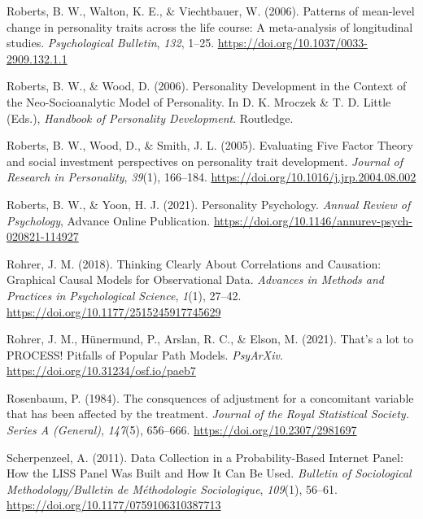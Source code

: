\documentclass[
  english,
  man, noextraspace]{apa7}
\begin{document}
\leavevmode\hypertarget{ref-robertsPatternsMeanlevelChange2006a}{}%
Roberts, B. W., Walton, K. E., \& Viechtbauer, W. (2006). Patterns of mean-level change in personality traits across the life course: A meta-analysis of longitudinal studies. \emph{Psychological Bulletin}, \emph{132}, 1--25. \url{https://doi.org/10.1037/0033-2909.132.1.1}

\leavevmode\hypertarget{ref-robertsPersonalityDevelopmentContext2006}{}%
Roberts, B. W., \& Wood, D. (2006). Personality Development in the Context of the Neo-Socioanalytic Model of Personality. In D. K. Mroczek \& T. D. Little (Eds.), \emph{Handbook of Personality Development}. Routledge.

\leavevmode\hypertarget{ref-robertsEvaluatingFiveFactor2005}{}%
Roberts, B. W., Wood, D., \& Smith, J. L. (2005). Evaluating Five Factor Theory and social investment perspectives on personality trait development. \emph{Journal of Research in Personality}, \emph{39}(1), 166--184. \url{https://doi.org/10.1016/j.jrp.2004.08.002}

\leavevmode\hypertarget{ref-robertsPersonalityPsychology2021}{}%
Roberts, B. W., \& Yoon, H. J. (2021). Personality Psychology. \emph{Annual Review of Psychology}, Advance Online Publication. \url{https://doi.org/10.1146/annurev-psych-020821-114927}

\leavevmode\hypertarget{ref-rohrerThinkingClearlyCorrelations2018}{}%
Rohrer, J. M. (2018). Thinking Clearly About Correlations and Causation: Graphical Causal Models for Observational Data. \emph{Advances in Methods and Practices in Psychological Science}, \emph{1}(1), 27--42. \url{https://doi.org/10.1177/2515245917745629}

\leavevmode\hypertarget{ref-rohrerThatLotPROCESS2021}{}%
Rohrer, J. M., Hünermund, P., Arslan, R. C., \& Elson, M. (2021). That's a lot to PROCESS! Pitfalls of Popular Path Models. \emph{PsyArXiv}. \url{https://doi.org/10.31234/osf.io/paeb7}

\leavevmode\hypertarget{ref-rosenbaumConsquencesAdjustmentConcomitant1984}{}%
Rosenbaum, P. (1984). The consquences of adjustment for a concomitant variable that has been affected by the treatment. \emph{Journal of the Royal Statistical Society. Series A (General)}, \emph{147}(5), 656--666. \url{https://doi.org/10.2307/2981697}

\leavevmode\hypertarget{ref-scherpenzeelDataCollectionProbabilityBased2011}{}%
Scherpenzeel, A. (2011). Data Collection in a Probability-Based Internet Panel: How the LISS Panel Was Built and How It Can Be Used. \emph{Bulletin of Sociological Methodology/Bulletin de Méthodologie Sociologique}, \emph{109}(1), 56--61. \url{https://doi.org/10.1177/0759106310387713}
\end{document}
